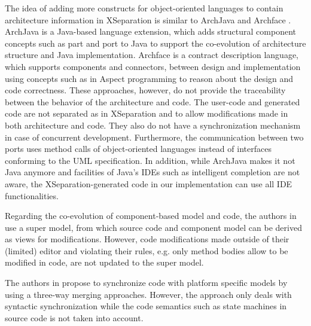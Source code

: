 The idea of adding more constructs for object-oriented languages to contain architecture information in XSeparation is similar to ArchJava \cite{aldrich2002archjava} and Archface \cite{ubayashi2010archface}.
ArchJava is a Java-based language extension, which adds structural component concepts such as part and port to Java to support the co-evolution of architecture structure and Java implementation. 
Archface is a contract description language, which supports components and connectors, between design and implementation using concepts such as  in Aspect programming to reason about the design and code correctness.
These approaches, however, do not provide the traceability between the behavior of the architecture and code.
The user-code and generated code are not separated as in XSeparation and  to allow modifications made in both architecture and code.
They also do not have a synchronization mechanism in case of concurrent development.
Furthermore, the communication between two ports uses method calls of object-oriented languages instead of interfaces conforming to the UML specification.
In addition, while ArchJava makes it not Java anymore and facilities of Java's IDEs such as intelligent completion are not aware, the XSeparation-generated code in our implementation can use all IDE functionalities.

Regarding the co-evolution of component-based model and code, the authors in \cite{kramer2015change} use a super model, from which source code and component model can be derived as views for modifications.
However, code modifications made outside of their (limited) editor and violating their rules, e.g. only method bodies allow to be modified in code, are not updated to the super model. 
 

The authors in \cite{angyal_synchronizing_2008} propose to synchronize code with platform specific models by using a three-way merging approaches.
However, the approach only deals with syntactic synchronization while the code semantics such as state machines in source code is not taken into account.

